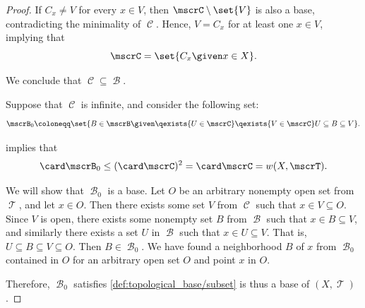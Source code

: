 \begin{proof}
  If \( C_x \neq V \) for every \( x \in V \), then \( \mscrC \setminus \set{ V } \) is also a base, contradicting the minimality of \( \mscrC \). Hence, \( V = C_x \) for at least one \( x \in V \), implying that
  \begin{equation*}
    \mscrC = \set{ C_x \given x \in X }.
  \end{equation*}

  We conclude that \( \mscrC \subseteq \mscrB \).

   Suppose that \( \mscrC \) is infinite, and consider the following set:
  \begin{equation*}
    \mscrB_0 \coloneqq \set{ B \in \mscrB \given \qexists {U \in \mscrC} \qexists {V \in \mscrC} U \subseteq B \subseteq V }.
  \end{equation*}

   implies that
  \begin{equation*}
    \card\mscrB_0 \leq (\card \mscrC)^2 = \card \mscrC = w(X, \mscrT).
  \end{equation*}

  We will show that \( \mscrB_0 \) is a base. Let \( O \) be an arbitrary nonempty open set from \( \mscrT \), and let \( x \in O \). Then there exists some set \( V \) from \( \mscrC \) such that \( x \in V \subseteq O \). Since \( V \) is open, there exists some nonempty set \( B \) from \( \mscrB \) such that \( x \in B \subseteq V \), and similarly there exists a set \( U \) in \( \mscrB \) such that \( x \in U \subseteq V \). That is, \( U \subseteq B \subseteq V \subseteq O \). Then \( B \in \mscrB_0 \). We have found a neighborhood \( B \) of \( x \) from \( \mscrB_0 \) contained in \( O \) for an arbitrary open set \( O \) and point \( x \) in \( O \).

  Therefore, \( \mscrB_0 \) satisfies \cref{def:topological_base/subset} is thus a base of \( (X, \mscrT) \).
\end{proof}

